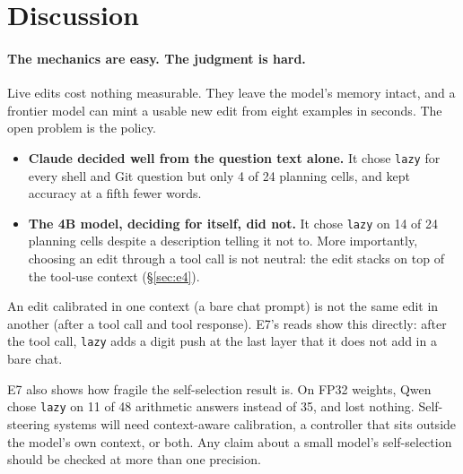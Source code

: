\section{Discussion}

\paragraph{The mechanics are easy. The judgment is hard.} Live edits cost nothing measurable. They leave the model's memory intact, and a frontier model can mint a usable new edit from eight examples in seconds. The open problem is the policy.
\begin{itemize}
\item \textbf{Claude decided well from the question text alone.} It chose \texttt{lazy} for every shell and Git question but only 4 of 24 planning cells, and kept accuracy at a fifth fewer words.
\item \textbf{The 4B model, deciding for itself, did not.} It chose \texttt{lazy} on 14 of 24 planning cells despite a description telling it not to. More importantly, choosing an edit through a tool call is not neutral: the edit stacks on top of the tool-use context (\S\ref{sec:e4}).
\end{itemize}
An edit calibrated in one context (a bare chat prompt) is not the same edit in another (after a tool call and tool response). E7's reads show this directly: after the tool call, \texttt{lazy} adds a digit push at the last layer that it does not add in a bare chat.

E7 also shows how fragile the self-selection result is. On FP32 weights, Qwen chose \texttt{lazy} on 11 of 48 arithmetic answers instead of 35, and lost nothing. Self-steering systems will need context-aware calibration, a controller that sits outside the model's own context, or both. Any claim about a small model's self-selection should be checked at more than one precision.

